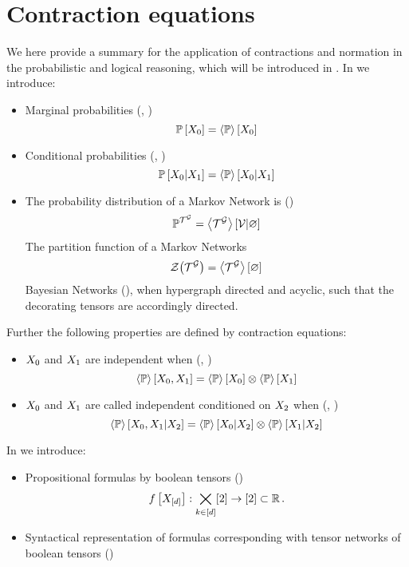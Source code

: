 \chapter{Contraction equations}

We here provide a summary for the application of contractions and normation in the probabilistic and logical reasoning, which will be introduced in .
In  we introduce:
\begin{itemize}
	\item Marginal probabilities (, )
		\[ \mathbb{P}\left[X_{0}\right] = \left\langle \mathbb{P}\right\rangle \left[ X_{0} \right] \]
	\item Conditional probabilities (, )
		\[ \mathbb{P}\left[X_{0}|X_{1}\right] = \left\langle \mathbb{P}\right\rangle \left[ X_{0} | X_{1} \right] \]
	\item The probability distribution of a Markov Network is ()
		\begin{align*}
			\mathbb{P}^{\mathcal{T}^{\mathcal{G}}} = \left\langle \mathcal{T}^{\mathcal{G}}\right\rangle \left[ \mathcal{V} | \varnothing \right]
		\end{align*}
		The partition function of a Markov Networks
		\begin{align*}
			\mathcal{Z}{\left(\mathcal{T}^{\mathcal{G}}\right)} = \left\langle \mathcal{T}^{\mathcal{G}}\right\rangle \left[ \varnothing \right]
		\end{align*}
		Bayesian Networks (), when hypergraph directed and acyclic, such that the decorating tensors are accordingly directed.
\end{itemize}

Further the following properties are defined by contraction equations:
\begin{itemize}
	\item $X_{0}$ and $X_{1}$ are independent when (, )
		\[  \left\langle \mathbb{P}\right\rangle \left[ X_{0},X_{1} \right]
		=  \left\langle \mathbb{P}\right\rangle \left[ X_{0} \right]
			\otimes  \left\langle \mathbb{P}\right\rangle \left[ X_{1} \right] \]
	\item $X_{0}$ and $X_{1}$ are called independent conditioned on $X_{2}$ when (, )
		\[ \left\langle \mathbb{P}\right\rangle \left[ X_{0},X_{1} | X_{2} \right]
		= \left\langle \mathbb{P}\right\rangle \left[ X_{0} | X_{2} \right]
		\otimes \left\langle \mathbb{P}\right\rangle \left[ X_{1} | X_{2} \right] \]
\end{itemize}

In  we introduce:
\begin{itemize}
	\item Propositional formulas by boolean tensors ()
		\[ f\left[X_{[d]}\right] : \bigtimes_{k\in[d]}[2] \rightarrow [2] \subset \mathbb{R} \, . \]
	\item Syntactical representation of formulas corresponding with tensor networks of boolean tensors ()
\end{itemize}